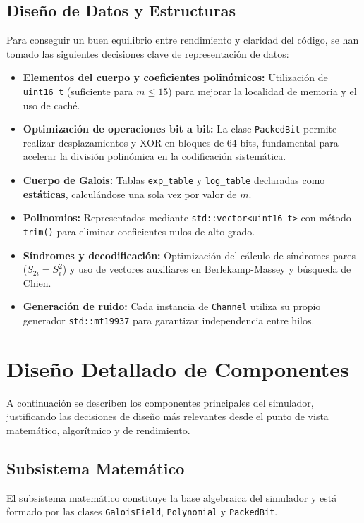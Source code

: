\subsection{Diseño de Datos y Estructuras}
\label{sub:diseno_datos}

Para conseguir un buen equilibrio entre rendimiento y claridad del código, se han tomado las siguientes decisiones clave de representación de datos:
\begin{itemize}
    \item \textbf{Elementos del cuerpo y coeficientes polinómicos:} Utilización de \verb|uint16_t| (suficiente para $m \leq 15$) para mejorar la localidad de memoria y el uso de caché.
    
    \item \textbf{Optimización de operaciones bit a bit:} La clase \texttt{PackedBit} permite realizar desplazamientos y XOR en bloques de 64 bits, fundamental para acelerar la división polinómica en la codificación sistemática.
    
    \item \textbf{Cuerpo de Galois:} Tablas \texttt{exp\_table} y \texttt{log\_table} declaradas como \textbf{estáticas}, calculándose una sola vez por valor de $m$.

    \item \textbf{Polinomios:} Representados mediante \texttt{std::vector<uint16\_t>} con método \texttt{trim()} para eliminar coeficientes nulos de alto grado.
    
    \item \textbf{Síndromes y decodificación:} Optimización del cálculo de síndromes pares ($S_{2i} = S_i^2$) y uso de vectores auxiliares en Berlekamp-Massey y búsqueda de Chien.
    
    \item \textbf{Generación de ruido:} Cada instancia de \texttt{Channel} utiliza su propio generador \texttt{std::mt19937} para garantizar independencia entre hilos.
\end{itemize}

\section{Diseño Detallado de Componentes}

A continuación se describen los componentes principales del simulador, justificando las decisiones de diseño más relevantes desde el punto de vista matemático, algorítmico y de rendimiento.

\subsection{Subsistema Matemático}
El subsistema matemático constituye la base algebraica del simulador y está formado por las clases \texttt{GaloisField}, \texttt{Polynomial} y \texttt{PackedBit}.


